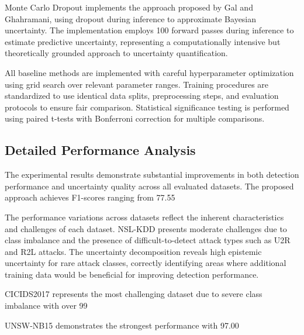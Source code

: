 \documentclass[journal]{IEEEtran}
\begin{document}
Monte Carlo Dropout implements the approach proposed by Gal and Ghahramani, using dropout during inference to approximate Bayesian uncertainty. The implementation employs 100 forward passes during inference to estimate predictive uncertainty, representing a computationally intensive but theoretically grounded approach to uncertainty quantification.

All baseline methods are implemented with careful hyperparameter optimization using grid search over relevant parameter ranges. Training procedures are standardized to use identical data splits, preprocessing steps, and evaluation protocols to ensure fair comparison. Statistical significance testing is performed using paired t-tests with Bonferroni correction for multiple comparisons.

\subsection{Detailed Performance Analysis}

The experimental results demonstrate substantial improvements in both detection performance and uncertainty quality across all evaluated datasets. The proposed approach achieves F1-scores ranging from 77.55%

The performance variations across datasets reflect the inherent characteristics and challenges of each dataset. NSL-KDD presents moderate challenges due to class imbalance and the presence of difficult-to-detect attack types such as U2R and R2L attacks. The uncertainty decomposition reveals high epistemic uncertainty for rare attack classes, correctly identifying areas where additional training data would be beneficial for improving detection performance.

CICIDS2017 represents the most challenging dataset due to severe class imbalance with over 99%

UNSW-NB15 demonstrates the strongest performance with 97.00%
\end{document}
